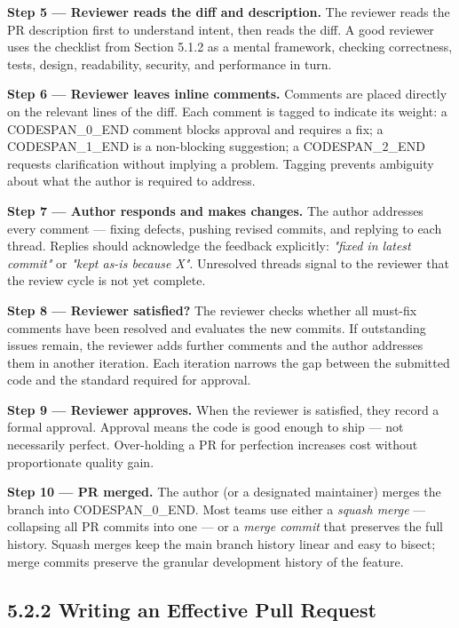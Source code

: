 \documentclass[11pt,a4paper]{book}
\begin{document}
\textbf{Step 5 --- Reviewer reads the diff and description.} The reviewer reads the PR description first to understand intent, then reads the diff. A good reviewer uses the checklist from Section 5.1.2 as a mental framework, checking correctness, tests, design, readability, security, and performance in turn.

\textbf{Step 6 --- Reviewer leaves inline comments.} Comments are placed directly on the relevant lines of the diff. Each comment is tagged to indicate its weight: a CODESPAN\_0\_END comment blocks approval and requires a fix; a CODESPAN\_1\_END is a non-blocking suggestion; a CODESPAN\_2\_END requests clarification without implying a problem. Tagging prevents ambiguity about what the author is required to address.

\textbf{Step 7 --- Author responds and makes changes.} The author addresses every comment --- fixing defects, pushing revised commits, and replying to each thread. Replies should acknowledge the feedback explicitly: \textit{"fixed in latest commit"} or \textit{"kept as-is because X"}. Unresolved threads signal to the reviewer that the review cycle is not yet complete.

\textbf{Step 8 --- Reviewer satisfied?} The reviewer checks whether all must-fix comments have been resolved and evaluates the new commits. If outstanding issues remain, the reviewer adds further comments and the author addresses them in another iteration. Each iteration narrows the gap between the submitted code and the standard required for approval.

\textbf{Step 9 --- Reviewer approves.} When the reviewer is satisfied, they record a formal approval. Approval means the code is good enough to ship --- not necessarily perfect. Over-holding a PR for perfection increases cost without proportionate quality gain.

\textbf{Step 10 --- PR merged.} The author (or a designated maintainer) merges the branch into CODESPAN\_0\_END. Most teams use either a \textit{squash merge} --- collapsing all PR commits into one --- or a \textit{merge commit} that preserves the full history. Squash merges keep the main branch history linear and easy to bisect; merge commits preserve the granular development history of the feature.

\subsection{5.2.2 Writing an Effective Pull Request}
\end{document}
